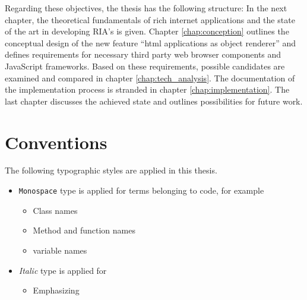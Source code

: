 Regarding these objectives, the thesis has the following structure: In the next chapter, the theoretical fundamentals of rich internet applications and the state of the art in developing RIA's is given. 
Chapter \ref{chap:conception} outlines the conceptual design of the new feature \enquote{html applications as object renderer} and defines requirements for necessary third party web browser components and JavaScript frameworks.
Based on these requirements, possible candidates are examined and compared in chapter \ref{chap:tech_analysis}.
The documentation of the implementation process is stranded in chapter \ref{chap:implementation}.
The last chapter discusses the achieved state and outlines possibilities for future work.\\[10mm]
 
\section{Conventions}

The following typographic styles are applied in this thesis.

\begin{itemize}
\item \texttt{Monospace} type is applied for terms belonging to code, for example
	\begin{itemize}
		\item Class names
		\item Method and function names
		\item variable names
	\end{itemize}
\item \emph{Italic} type is applied for
	\begin{itemize}
		\item Emphasizing
	\end{itemize}
\end{itemize}
